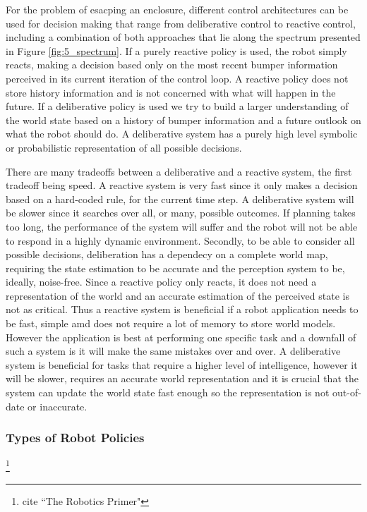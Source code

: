 For the problem of esacping an enclosure, different control architectures can be used for decision making that range from deliberative control to reactive control, including a combination of both approaches that lie along the spectrum presented in Figure \ref{fig:5_spectrum}. If a purely reactive policy is used, the robot simply reacts, making a decision based only on the most recent bumper information perceived in its current iteration of the control loop. A reactive policy does not store history information and is not concerned with what will happen in the future. If a deliberative policy is used we try to build a larger understanding of the world state based on a history of bumper information and a future outlook on what the robot should do. A deliberative system has a purely high level symbolic or probabilistic representation of all possible decisions. 

There are many tradeoffs between a deliberative and a reactive system, the first tradeoff being speed. A reactive system is very fast since it only makes a decision based on a hard-coded rule, for the current time step. A deliberative system will be slower since it searches over all, or many, possible outcomes. If planning takes too long, the performance of the system will suffer and the robot will not be able to respond in a highly dynamic environment. Secondly, to be able to consider all possible decisions, deliberation has a dependecy on a complete world map, requiring the state estimation to be accurate and the perception system to be, ideally, noise-free. Since a reactive policy only reacts, it does not need a representation of the world and an accurate estimation of the perceived state is not as critical. Thus a reactive system is beneficial if a robot application needs to be fast, simple amd does not require a lot of memory to store world models. However the application is best at performing one specific task and a downfall of such a system is it will make the same mistakes over and over. A deliberative system is beneficial for tasks that require a higher level of intelligence, however it will be slower, requires an accurate world representation and it is crucial that the system can update the world state fast enough so the representation is not out-of-date or inaccurate. 

\subsubsection{Types of Robot Policies}\footnote{cite ``The Robotics Primer"}

